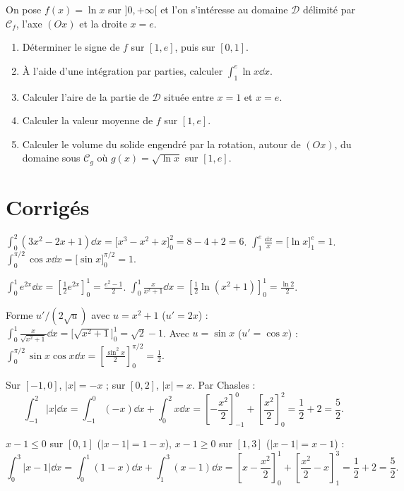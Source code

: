 On pose $f(x)=\ln x$ sur $]0,+\infty[$ et l'on s'intéresse au domaine $\mathcal D$ délimité par
$\mathcal C_f$, l'axe $(Ox)$ et la droite $x=e$.
\begin{enumerate}[label=\arabic*)]
\item Déterminer le signe de $f$ sur $[1,e]$, puis sur $[0,1]$.
\item À l'aide d'une intégration par parties, calculer $\displaystyle\int_1^e \ln x\dd x$.
\item Calculer l'aire de la partie de $\mathcal D$ située entre $x=1$ et $x=e$.
\item Calculer la valeur moyenne de $f$ sur $[1,e]$.
\item Calculer le volume du solide engendré par la rotation, autour de $(Ox)$, du domaine sous
$\mathcal C_g$ où $g(x)=\sqrt{\ln x}$ sur $[1,e]$.
\end{enumerate}

\section{Corrigés}

$\displaystyle\int_0^2(3x^2-2x+1)\dd x=\big[x^3-x^2+x\big]_0^2=8-4+2=6$.\;
$\displaystyle\int_1^e\frac{\dd x}{x}=\big[\ln x\big]_1^e=1$.\;
$\displaystyle\int_0^{\pi/2}\cos x\dd x=\big[\sin x\big]_0^{\pi/2}=1$.

$\displaystyle\int_0^1 e^{2x}\dd x=\left[\frac12 e^{2x}\right]_0^1=\frac{e^2-1}{2}$.\;
$\displaystyle\int_0^1\frac{x}{x^2+1}\dd x=\left[\frac12\ln(x^2+1)\right]_0^1=\frac{\ln 2}{2}$.

Forme $u'/(2\sqrt u)$ avec $u=x^2+1$ ($u'=2x$) :
$\displaystyle\int_0^1\frac{x}{\sqrt{x^2+1}}\dd x=\big[\sqrt{x^2+1}\big]_0^1=\sqrt2-1$.\;
Avec $u=\sin x$ ($u'=\cos x$) : $\displaystyle\int_0^{\pi/2}\sin x\cos x\dd x
=\left[\frac{\sin^2 x}{2}\right]_0^{\pi/2}=\frac12$.

Sur $[-1,0]$, $|x|=-x$ ; sur $[0,2]$, $|x|=x$. Par Chasles :
\[
\int_{-1}^{2}|x|\dd x=\int_{-1}^0(-x)\dd x+\int_0^2 x\dd x=\left[-\frac{x^2}{2}\right]_{-1}^0+\left[\frac{x^2}{2}\right]_0^2=\frac12+2=\frac52.
\]

$x-1\le0$ sur $[0,1]$ ($|x-1|=1-x$), $x-1\ge0$ sur $[1,3]$ ($|x-1|=x-1$) :
\[
\int_0^3|x-1|\dd x=\int_0^1(1-x)\dd x+\int_1^3(x-1)\dd x
=\left[x-\frac{x^2}{2}\right]_0^1+\left[\frac{x^2}{2}-x\right]_1^3=\frac12+2=\frac52.
\]

